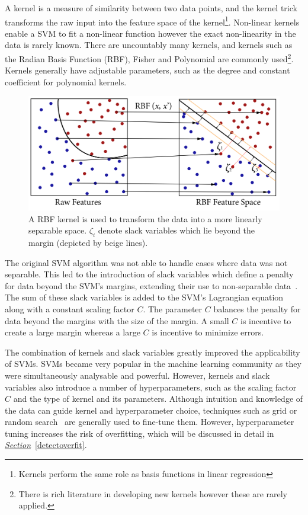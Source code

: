 \documentclass[12pt, twoside]{book}
\begin{document}
A kernel is a measure of similarity between two data points, and the kernel trick transforms the raw input into the feature space of the kernel\footnote{Kernels perform the same role as basis functions in linear regression}. Non-linear kernels enable a SVM to fit a non-linear function however the exact non-linearity in the data is rarely known. There are uncountably many kernels, and kernels such as the Radian Basis Function (RBF), Fisher and Polynomial are commonly used\footnote{There is rich literature in developing new kernels however these are rarely applied.}. Kernels generally have adjustable parameters, such as the degree and constant coefficient for polynomial kernels. 

\begin{figure}[h]
	\centering\includegraphics[width=0.8\linewidth]{svm.png}
	\caption{A RBF kernel is used to transform the data into a more linearly separable space. $\zeta_i$ denote slack variables which lie beyond the margin (depicted by beige lines). }
	\label{svm}
\end{figure}

The original SVM algorithm was not able to handle cases where data was not separable. This led to the introduction of slack variables which define a penalty for data beyond the SVM's margins, extending their use to non-separable data~\cite{cortes1995support}. The sum of these slack variables is added to the SVM's Lagrangian equation along with a constant scaling factor $C$. The parameter $C$ balances the penalty for data beyond the margins with the size of the margin. A small $C$ is incentive to create a large margin whereas a large $C$ is incentive to minimize errors.

The combination of kernels and slack variables greatly improved the applicability of SVMs. SVMs became very popular in the machine learning community as they were simultaneously analysable and powerful. However, kernels and slack variables also introduce a number of hyperparameters, such as the scaling factor $C$ and the type of kernel and its parameters. Although intuition and knowledge of the data can guide kernel and hyperparameter choice, techniques such as grid or random search~\cite{gridsearch} are generally used to fine-tune them. However, hyperparameter tuning increases the risk of overfitting, which will be discussed in detail in \textit{\hyperref[detectoverfit]{Section}}~\ref{detectoverfit}. 
\end{document}
